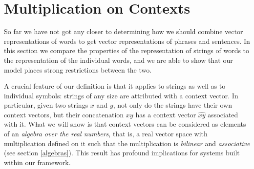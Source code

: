 %



\section{Multiplication on Contexts}

So far we have not got any closer to determining how we should combine vector representations of words to get vector representations of phrases and sentences. In this section we compare the properties of the representation of strings of words to the representation of the individual words, and we are able to show that our model places strong restrictions between the two.


A crucial feature of our definition is that it applies to strings as well as to individual symbols: strings of any size are attributed with a context vector. In particular, given two strings $x$ and $y$, not only do the strings have their own context vectors, but their concatenation $xy$ has a context vector $\widehat{xy}$ associated with it.  What we will show is that context vectors can be considered as elements of an \emph{algebra over the real numbers}, that is, a real vector space with multiplication defined on it such that the multiplication is \emph{bilinear} and \emph{associative} (see section \ref{algebras}). This result has profound implications for systems built within our framework.

